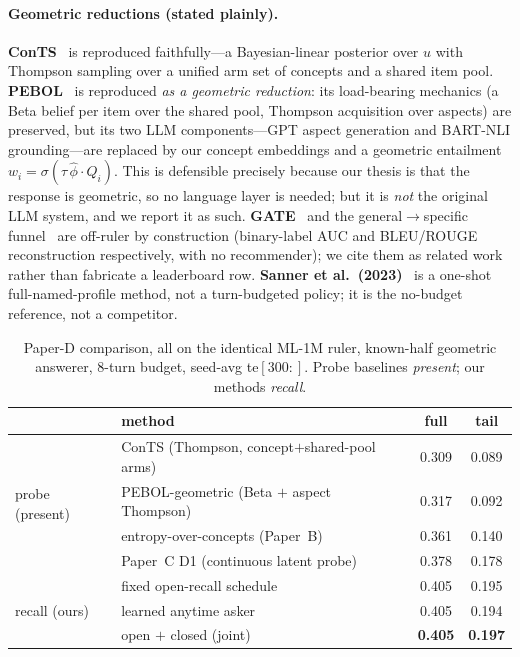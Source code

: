 \documentclass[11pt]{article}
\begin{document}
\paragraph{Geometric reductions (stated plainly).} \textbf{ConTS}~\cite{li21conts} is reproduced faithfully---a Bayesian-linear
posterior over $u$ with Thompson sampling over a unified arm set of concepts and a shared item pool. \textbf{PEBOL}~\cite{pebol} is
reproduced \emph{as a geometric reduction}: its load-bearing mechanics (a Beta belief per item over the shared pool,
Thompson acquisition over aspects)
are preserved, but its two LLM components---GPT aspect generation and BART-NLI grounding---are replaced by our concept
embeddings and a geometric entailment $w_i=\sigma(\tau\,\hat\phi\!\cdot\!\hat Q_i)$. This is defensible precisely because
our thesis is that the response is geometric, so no language layer is needed; but it is \emph{not} the original LLM
system, and we report it as such. \textbf{GATE}~\cite{gate} and the general$\to$specific funnel~\cite{montazeralghaem25} are off-ruler by construction
(binary-label AUC and BLEU/ROUGE reconstruction respectively, with no recommender); we cite them as related work rather
than fabricate a leaderboard row. \textbf{Sanner et al.\ (2023)}~\cite{sanner23} is a one-shot full-named-profile method, not a
turn-budgeted policy; it is the no-budget reference, not a competitor.

\begin{table}[t]
\centering
\caption{Paper-D comparison, all on the identical ML-1M ruler, known-half geometric answerer, $8$-turn budget,
seed-avg te$[300{:}]$. Probe baselines \emph{present}; our methods \emph{recall}.}
\label{tab:baselines}
\begin{tabular}{llcc}
\toprule
 & method & full & tail \\
\midrule
\multirow{4}{*}{probe (present)}
 & ConTS (Thompson, concept$+$shared-pool arms) & 0.309 & 0.089 \\
 & PEBOL-geometric (Beta $+$ aspect Thompson)  & 0.317 & 0.092 \\
 & entropy-over-concepts (Paper~B)             & 0.361 & 0.140 \\
 & Paper~C D1 (continuous latent probe)       & 0.378 & 0.178 \\
\midrule
\multirow{3}{*}{recall (ours)}
 & fixed open-recall schedule                 & 0.405 & 0.195 \\
 & learned anytime asker                      & 0.405 & 0.194 \\
 & open $+$ closed (joint)                    & \textbf{0.405} & \textbf{0.197} \\
\bottomrule
\end{tabular}
\end{table}
\end{document}
